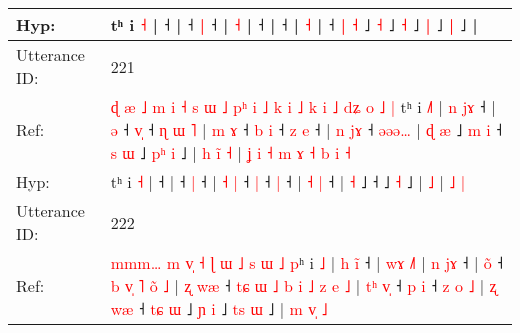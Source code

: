 \documentclass[10pt]{article}
\DeclareRobustCommand{\hl}[1]{{\textcolor{red}{#1}}}
\begin{document}
\begin{longtable}{ll}
 \\
Hyp: & tʰ i \hl{}\hl{˧} |\hl{}\hl{}\hl{}\hl{}\hl{} ˧\hl{}\hl{}\hl{}\hl{}\hl{}\hl{}\hl{}\hl{}\hl{}\hl{}\hl{}\hl{}\hl{}\hl{}\hl{}\hl{}\hl{}\hl{}\hl{}\hl{}\hl{}\hl{}\hl{}\hl{}\hl{} |\hl{}\hl{}\hl{}\hl{} ˧\hl{}\hl{} \hl{}\hl{|} ˧\hl{}\hl{}\hl{}\hl{}\hl{}\hl{} |\hl{}\hl{}\hl{} \hl{}\hl{˧} |\hl{}\hl{}\hl{}\hl{} ˧\hl{}\hl{}\hl{}\hl{}\hl{}\hl{} |\hl{}\hl{}\hl{}\hl{} ˧\hl{}\hl{}\hl{}\hl{}\hl{}\hl{}\hl{}\hl{}\hl{}\hl{}\hl{}\hl{}\hl{}\hl{}\hl{}\hl{}\hl{}\hl{}\hl{}\hl{}\hl{}\hl{}\hl{}\hl{}\hl{}\hl{}\hl{}\hl{} |\hl{}\hl{}\hl{}\hl{}\hl{} \hl{˧} |\hl{}\hl{}\hl{}\hl{}\hl{}\hl{}\hl{}\hl{}\hl{}\hl{} ˧\hl{}\hl{}\hl{}\hl{}\hl{}\hl{} \hl{}\hl{|} \hl{˧} ˩\hl{}\hl{} \hl{˧} ˩\hl{}\hl{} \hl{˧} ˩\hl{}\hl{} \hl{|} ˩\hl{}\hl{}\hl{} \hl{|} ˩ |\hl{}\hl{}\hl{}\hl{}\hl{}\hl{}\hl{}
 \\
\midrule
Utterance ID: & 221 \\
Ref: & \hl{ɖ}\hl{ }\hl{æ}\hl{ }\hl{˩}\hl{ }\hl{m}\hl{ }\hl{i}\hl{ }\hl{˧}\hl{ }\hl{s}\hl{ }\hl{ɯ}\hl{ }\hl{˩}\hl{ }\hl{p}\hl{ʰ}\hl{ }\hl{i}\hl{ }\hl{˩}\hl{ }\hl{k}\hl{ }\hl{i}\hl{ }\hl{˩}\hl{ }\hl{k}\hl{ }\hl{i}\hl{ }\hl{˩}\hl{ }\hl{d}\hl{ʑ}\hl{ }\hl{o}\hl{ }\hl{˩}\hl{ }\hl{|}\hl{ }tʰ i \hl{˩}\hl{˥} |\hl{ }\hl{n}\hl{ }\hl{j}\hl{ɤ} ˧ |\hl{ }\hl{ə} ˧ \hl{v}\hl{̩} ˧\hl{ }\hl{ɳ}\hl{ }\hl{ɯ}\hl{ }\hl{˥} | \hl{m} \hl{ɤ} ˧\hl{ }\hl{b} \hl{i} ˧\hl{ }\hl{z} \hl{e} ˧ | \hl{n} \hl{j}\hl{ɤ} ˧\hl{ }\hl{ə}\hl{ə}\hl{ə}\hl{…} |\hl{ }\hl{ɖ} \hl{æ} ˩\hl{ }\hl{m}\hl{ }\hl{i} ˧\hl{ }\hl{s}\hl{ }\hl{ɯ} ˩\hl{ }\hl{p}\hl{ʰ} \hl{i} ˩ |\hl{ }\hl{h}\hl{ }\hl{i}\hl{̃} \hl{˧} |\hl{ }\hl{ʝ}\hl{ }\hl{i}\hl{ }\hl{˧}\hl{ }\hl{m}\hl{ }\hl{ɤ}\hl{ }\hl{˧}\hl{ }\hl{b} \hl{i} \hl{˧}
 \\
Hyp: & \hl{}\hl{}\hl{}\hl{}\hl{}\hl{}\hl{}\hl{}\hl{}\hl{}\hl{}\hl{}\hl{}\hl{}\hl{}\hl{}\hl{}\hl{}\hl{}\hl{}\hl{}\hl{}\hl{}\hl{}\hl{}\hl{}\hl{}\hl{}\hl{}\hl{}\hl{}\hl{}\hl{}\hl{}\hl{}\hl{}\hl{}\hl{}\hl{}\hl{}\hl{}\hl{}\hl{}\hl{}\hl{}\hl{}tʰ i \hl{}\hl{˧} |\hl{}\hl{}\hl{}\hl{}\hl{} ˧ |\hl{}\hl{} ˧ \hl{}\hl{|} ˧\hl{}\hl{}\hl{}\hl{}\hl{}\hl{} | \hl{˧} \hl{|} ˧\hl{}\hl{} \hl{|} ˧\hl{}\hl{} \hl{|} ˧ | \hl{˧} \hl{}\hl{|} ˧\hl{}\hl{}\hl{}\hl{}\hl{} |\hl{}\hl{} \hl{˧} ˩\hl{}\hl{}\hl{}\hl{} ˧\hl{}\hl{}\hl{}\hl{} ˩\hl{}\hl{}\hl{} \hl{˧} ˩ |\hl{}\hl{}\hl{}\hl{}\hl{} \hl{˩} |\hl{}\hl{}\hl{}\hl{}\hl{}\hl{}\hl{}\hl{}\hl{}\hl{}\hl{}\hl{}\hl{}\hl{} \hl{˩} \hl{|}
 \\
\midrule
Utterance ID: & 222 \\
Ref: & \hl{m}\hl{m}\hl{m}\hl{…}\hl{ }\hl{m}\hl{ }\hl{v}\hl{̩}\hl{ }\hl{˧}\hl{ }\hl{ɭ}\hl{ }\hl{ɯ}\hl{ }\hl{˩}\hl{ }\hl{s}\hl{ }\hl{ɯ}\hl{ }\hl{˩}\hl{ }\hl{p}ʰ i \hl{˩} |\hl{ }\hl{h}\hl{ }\hl{i}\hl{̃} ˧ |\hl{ }\hl{w}\hl{ɤ} \hl{˩}\hl{˥} |\hl{ }\hl{n}\hl{ }\hl{j}\hl{ɤ} ˧ |\hl{ }\hl{o}\hl{̃} ˧\hl{ }\hl{b}\hl{ }\hl{v}\hl{̩}\hl{ }\hl{˥}\hl{ }\hl{o}\hl{̃}\hl{ }\hl{˩} |\hl{ }\hl{ʐ}\hl{ }\hl{w}\hl{æ} ˧\hl{ }\hl{t}\hl{ɕ}\hl{ }\hl{ɯ}\hl{ }\hl{˩}\hl{ }\hl{b}\hl{ }\hl{i}\hl{ }\hl{˩}\hl{ }\hl{z}\hl{ }\hl{e}\hl{ }\hl{˩} |\hl{ }\hl{t}\hl{ʰ}\hl{ }\hl{v}\hl{̩} ˧\hl{ }\hl{p} \hl{i} ˧\hl{ }\hl{z}\hl{ }\hl{o}\hl{ }\hl{˩} | \hl{ʐ} \hl{w}\hl{æ} ˧ \hl{t}\hl{ɕ} \hl{ɯ} ˩\hl{ }\hl{ɲ} \hl{i} ˩\hl{ }\hl{t}\hl{s} \hl{ɯ} ˩ |\hl{ }\hl{m} \hl{v}\hl{̩} \hl{˩}

\end{longtable}
\end{document}
